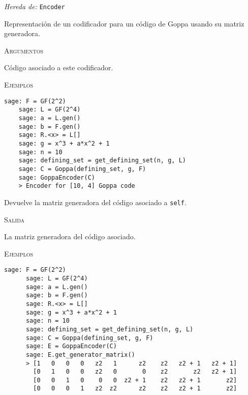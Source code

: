 \begin{description}[leftmargin=1em, font=\normalfont\ttfamily, style=nextline]
\item[class GoppaEncoder(self, code)]

\emph{Hereda de:} \texttt{Encoder}

Representación de un codificador para un código de Goppa usando su matriz generadora.

\textsc{Argumentos}
\begin{description}[font=\normalfont\ttfamily]
  \item[code] Código asociado a este codificador.
\end{description}

\textsc{Ejemplos}
  \begin{lstlisting}[gobble=4]
    sage: F = GF(2^2)
    sage: L = GF(2^4)
    sage: a = L.gen()
    sage: b = F.gen()
    sage: R.<x> = L[]
    sage: g = x^3 + a*x^2 + 1
    sage: n = 10
    sage: defining_set = get_defining_set(n, g, L)
    sage: C = Goppa(defining_set, g, F)
    sage: GoppaEncoder(C)
    > Encoder for [10, 4] Goppa code
  \end{lstlisting}

  \begin{description}[font=\ttfamily, style=nextline]
    \item[get\_generator\_matrix(self)] Devuelve la matriz generadora del código asociado a \texttt{self}.
    
    \textsc{Salida}
    \begin{description}[font=\normalfont\ttfamily]
      \item[] La matriz generadora del código asociado.
    \end{description}

    \textsc{Ejemplos}
    \begin{lstlisting}[gobble=4]
      sage: F = GF(2^2)
      sage: L = GF(2^4)
      sage: a = L.gen()
      sage: b = F.gen()
      sage: R.<x> = L[]
      sage: g = x^3 + a*x^2 + 1
      sage: n = 10
      sage: defining_set = get_defining_set(n, g, L)
      sage: C = Goppa(defining_set, g, F)
      sage: E = GoppaEncoder(C)
      sage: E.get_generator_matrix()
      > [1   0   0   0   z2   1      z2    z2   z2 + 1   z2 + 1]
        [0   1   0   0   z2   0       0    z2       z2   z2 + 1]
        [0   0   1   0    0   0  z2 + 1    z2   z2 + 1       z2]
        [0   0   0   1   z2  z2      z2    z2   z2 + 1       z2]
    \end{lstlisting}


\end{description}
\end{description}
